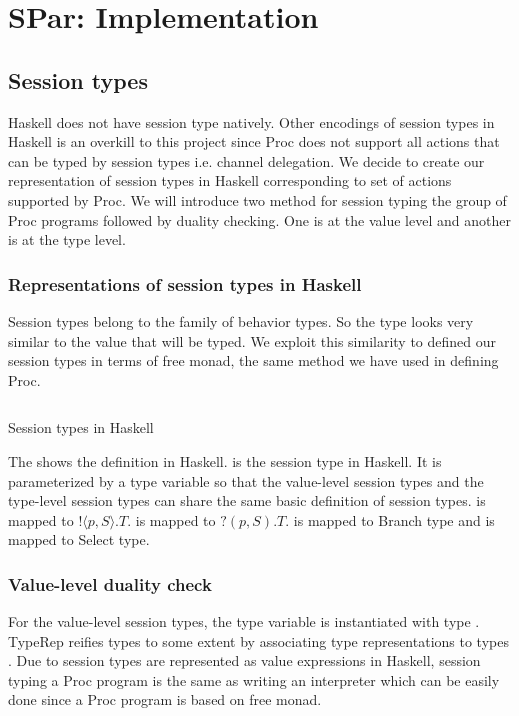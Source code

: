 \chapter{SPar: Implementation} \label{chap:impl}
\section{Session types} \label{impl:sec:session}
Haskell does not have session type natively. Other encodings of session types in Haskell is an overkill to this project since Proc does not support all actions that can be typed by session types i.e. channel delegation. We decide to create our representation of session types in Haskell corresponding to set of actions supported by Proc. We will introduce two method for session typing the group of Proc programs followed by duality checking. One is at the value level and another is at the type level.
\subsection{Representations of session types in Haskell}
Session types belong to the family of behavior types. So the type looks very similar to the value that will be typed. We exploit this similarity to defined our session types in terms of free monad, the same method we have used in defining Proc.
\begin{listing}[ht]
    \inputminted{Haskell}{impl/type.hs}
    \caption{Session types in Haskell}
    \label{impl:code:type}
\end{listing}

The  shows the definition in Haskell.  is the session type in Haskell. It is parameterized by a type variable  so that the value-level session types and the type-level session types can share the same basic definition of session types.  is mapped to $! \langle p, S \rangle . T$.  is mapped to $?(p, S).T$.  is mapped to Branch type and  is mapped to Select type.
\subsection{Value-level duality check}
For the value-level session types, the type variable  is instantiated with type . TypeRep reifies types to some extent by associating type representations to types \cite{DataTypeable}. Due to session types are represented as value expressions in Haskell, session typing a Proc program is the same as writing an interpreter which can be easily done since a Proc program is based on free monad. 

